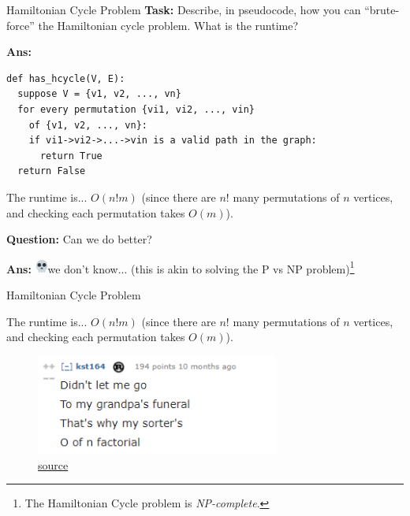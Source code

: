 \documentclass{beamer}
\newcommand{\emojiskull}{\includegraphics[width=12pt]{img/skull.png}}
\begin{document}
\begin{frame}[fragile]{Hamiltonian Cycle Problem}
\textbf{Task:} Describe, in pseudocode, how you can ``brute-force'' the Hamiltonian cycle problem. What is the runtime?

\pause

\textbf{Ans:}
\begin{verbatim}
def has_hcycle(V, E):
  suppose V = {v1, v2, ..., vn}
  for every permutation {vi1, vi2, ..., vin} 
    of {v1, v2, ..., vn}:
    if vi1->vi2->...->vin is a valid path in the graph:
      return True
  return False
\end{verbatim}

The runtime is... \pause $O(n! m)$ (since there are $n!$ many permutations of $n$ vertices, and checking each permutation takes $O(m)$).
\pause

\textbf{Question:} Can we do better?

\textbf{Ans:} \emojiskull we don't know... (this is akin to solving the P vs NP problem)\footnote{The Hamiltonian Cycle problem is \textit{NP-complete}.}

\end{frame}

\begin{frame}{Hamiltonian Cycle Problem}

The runtime is... $O(n! m)$ (since there are $n!$ many permutations of $n$ vertices, and checking each permutation takes $O(m)$).

\begin{figure}
    \centering
    \includegraphics[width=8cm]{img/factorial_time.png}
    \caption*{\color{blue}\href{https://www.reddit.com/r/ProgrammerHumor/comments/n8bgw1/boss_makes_a_dollar_i_make_a_dime/}{source}}
\end{figure}

\end{frame}
\end{document}
